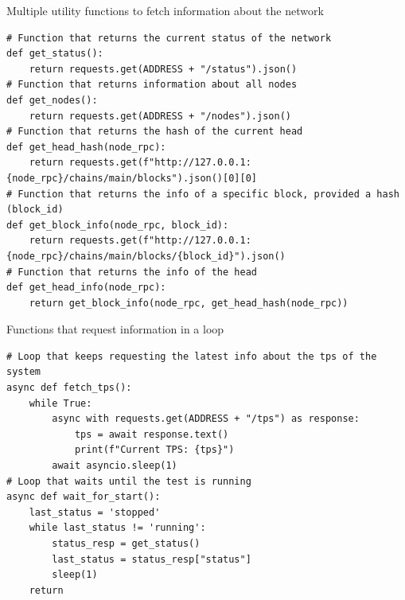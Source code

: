 \begin{listing}[H]
\caption{Multiple utility functions to fetch information about the network}
\label{lst:python_code}
\begin{verbatim}
# Function that returns the current status of the network
def get_status():
    return requests.get(ADDRESS + "/status").json()
# Function that returns information about all nodes
def get_nodes():
    return requests.get(ADDRESS + "/nodes").json()
# Function that returns the hash of the current head
def get_head_hash(node_rpc):
    return requests.get(f"http://127.0.0.1:{node_rpc}/chains/main/blocks").json()[0][0]
# Function that returns the info of a specific block, provided a hash (block_id)
def get_block_info(node_rpc, block_id):
    return requests.get(f"http://127.0.0.1:{node_rpc}/chains/main/blocks/{block_id}").json()
# Function that returns the info of the head
def get_head_info(node_rpc):
    return get_block_info(node_rpc, get_head_hash(node_rpc))
\end{verbatim}
\end{listing}




\begin{listing}[H]
\caption{Functions that request information in a loop}
\label{lst:python_code}
\begin{verbatim}
# Loop that keeps requesting the latest info about the tps of the system
async def fetch_tps():
    while True:
        async with requests.get(ADDRESS + "/tps") as response:
            tps = await response.text()
            print(f"Current TPS: {tps}")
        await asyncio.sleep(1)
# Loop that waits until the test is running
async def wait_for_start():
    last_status = 'stopped'
    while last_status != 'running':
        status_resp = get_status()
        last_status = status_resp["status"]
        sleep(1)
    return
\end{verbatim}
\end{listing}


